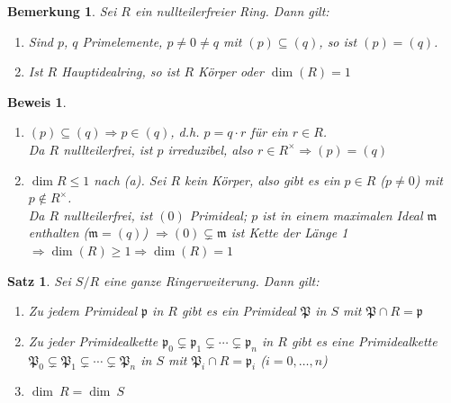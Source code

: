 \documentclass[a4paper,12pt]{scrbook}
\theoremstyle{break}
\newtheorem{Satz}{Satz}
\newtheorem{Bem}[Def]{Bemerkung}
\theoremstyle{nonumberbreak}
\newtheorem{Bew}{Beweis}
\theoremstyle{nonumberplain}
\begin{document}
\begin{Bem}
\label{2.25}
Sei $R$ ein nullteilerfreier Ring. Dann gilt: 
\begin{enumerate}
\item Sind $p$, $q$ Primelemente, $p\neq 0\neq q$ mit $(p)\subseteq (q)$, so ist $(p)=(q)$.
\item Ist $R$ Hauptidealring, so ist $R$ Körper oder $\dim(R)=1$
\end{enumerate}
\end{Bem}
\begin{Bew}
\begin{enumerate}

\item $(p)\subseteq (q)\Rightarrow p\in(q)$, d.h. $p=q\cdot r$ für ein $r\in R$.\\
Da $R$ nullteilerfrei, ist $p$ irreduzibel, also $r\in R^{\times}\Rightarrow (p)=(q)$

\item $\dim R\leq 1$ nach (a). Sei $R$ kein Körper, also gibt es ein $p\in R$
($p\neq 0$) mit $p\notin R^{\times}$.\\
Da $R$ nullteilerfrei, ist $(0)$ Primideal; $p$ ist in einem maximalen Ideal $\mathfrak{m}$ enthalten ($\mathfrak{m}=(q)$)
$\Rightarrow (0)\subsetneq \mathfrak{m}$ ist Kette der Länge 1
$\Rightarrow \dim(R)\geq 1 \Rightarrow \dim(R)=1$

\end{enumerate}
\end{Bew}

\begin{Satz}
\label{Satz10}
Sei $S/R$ eine ganze Ringerweiterung. Dann gilt:
\begin{enumerate}

\item Zu jedem Primideal $\mathfrak{p}$ in $R$ gibt es ein Primideal $\mathfrak{P}$ in $S$
mit $\mathfrak{P}\cap R=\mathfrak{p}$

\item Zu jeder Primidealkette $\mathfrak{p}_0\subsetneq \mathfrak{p}_1\subsetneq \cdots\subsetneq
\mathfrak{p}_n$ in $R$ gibt es eine Primidealkette 
$\mathfrak{P}_0\subsetneq \mathfrak{P}_1\subsetneq \cdots \subsetneq \mathfrak{P}_n$ in $S$
mit $\mathfrak{P}_i\cap R=\mathfrak{p}_i$ ($i=0,\ldots, n$)

\item \label{Satz10c}$\dim\ R= \dim\ S$

\end{enumerate}
\end{Satz}
\end{document}
